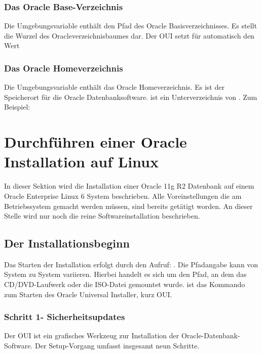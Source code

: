         \subsubsection{Das Oracle Base-Verzeichnis}
          Die Umgebungsvariable  enthält den Pfad des Oracle Basisverzeichnisses. Es stellt die Wurzel des Oracleverzeichnisbaumes dar. Der OUI setzt für  automatisch den Wert


        \subsubsection{Das Oracle Homeverzeichnis}
          Die Umgebungsvariable  enthält das Oracle Homeverzeichnis. Es ist der Speicherort für die Oracle Datenbanksoftware.  ist ein Unterverzeichnis von . Zum Beispiel:


          \begin{literaturinternet}
            \item \cite{BABHAIIJ}
          \end{literaturinternet}

    \section{Durchführen einer Oracle Installation auf Linux}
      In dieser Sektion wird die Installation einer Oracle 11g R2 Datenbank auf einem Oracle Enterprise Linux 6 System beschrieben. Alle Voreinstellungen die am Betriebssystem gemacht werden müssen, sind bereits getätigt worden. An dieser Stelle wird nur noch die reine Softwareinstallation beschrieben.
      \subsection{Der Installationsbeginn}
        Das Starten der Installation erfolgt durch den Aufruf: . Die Pfadangabe  kann von System zu System variieren. Hierbei handelt es sich um den Pfad, an dem das CD/DVD-Laufwerk oder die ISO-Datei gemountet wurde.  ist das Kommando zum Starten des Oracle Universal Installer, kurz OUI.
        \subsubsection{Schritt 1- Sicherheitsupdates}
          Der OUI ist ein grafisches Werkzeug zur Installation der Oracle-Datenbank-Software. Der Setup-Vorgang umfasst insgesamt neun Schritte.


